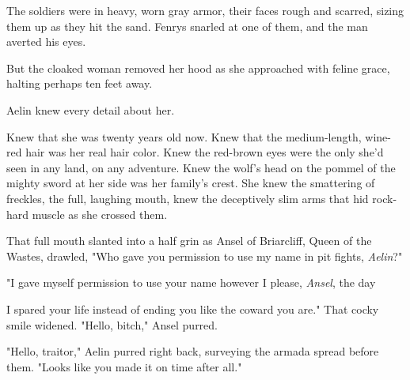 The soldiers were in heavy, worn gray armor, their faces rough and scarred, sizing them up as they hit the sand. Fenrys snarled at one of them, and the man averted his eyes.

But the cloaked woman removed her hood as she approached with feline grace, halting perhaps ten feet away.

Aelin knew every detail about her.

Knew that she was twenty years old now. Knew that the medium-length, wine-red hair was her real hair color. Knew the red-brown eyes were the only she'd seen in any land, on any adventure. Knew the wolf's head on the pommel of the mighty sword at her side was her family's crest. She knew the smattering of freckles, the full, laughing mouth, knew the deceptively slim arms that hid rock-hard muscle as she crossed them.

That full mouth slanted into a half grin as Ansel of Briarcliff, Queen of the Wastes, drawled, "Who gave you permission to use my name in pit fights, \emph{Aelin}?"

"I gave myself permission to use your name however I please,
\emph{Ansel}, the day

I spared your life instead of ending you like the coward you are." That cocky smile widened. "Hello, bitch," Ansel purred.

"Hello, traitor," Aelin purred right back, surveying the armada spread before them. "Looks like you made it on time after all."

